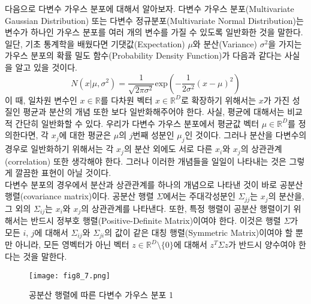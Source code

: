 \documentclass[a4paper]{oblivoir}
\begin{document}
다음으로 다변수 가우스 분포에 대해서 알아보자. 다변수 가우스 분포(Multivariate Gaussian Distribution) 또는 다변수 정규분포(Multivariate Normal Distribution)는 변수가 하나인 가우스 분포를 여러 개의 변수를 가질 수 있도록 일반화한 것을 말한다. 일단, 기초 통계학을 배웠다면 기댓값(Expectation) $\mu$와 분산(Variance) $\sigma^2$을 가지는 가우스 분포의 확률 밀도 함수(Probability Density Function)가 다음과 같다는 사실을 알고 있을 것이다. 
\begin{equation}
N(x|\mu, \sigma^2) = \frac{1}{\sqrt{2 \pi \sigma^2}} \textrm{exp}(-\frac{1}{2 \sigma^2} (x-\mu)^2) \label{eq:8-13} 
\end{equation}
이 때, 일차원 변수인 $x \in \mathbb{R}$를 다차원 벡터 $ {x} \in {\mathbb{R}}^{D}$로 확장하기 위해서는 $x$가 가진 성질인 평균과 분산의 개념 또한 보다 일반화해주어야 한다. 사실, 평균에 대해서는 비교적 간단히 일반화할 수 있다. 우리가 다변수 가우스 분포에서 평균값 벡터 $ {\mu} \in {\mathbb{R}}^{D}$를 정의한다면, 각 $x_j$에 대한 평균은 $ {\mu}$의 $j$번째 성분인 $\mu_j$인 것이다. 그러나 분산을 다변수의 경우로 일반화하기 위해서는 각 $x_j$의 분산 외에도 서로 다른 $x_i$와 $x_j$의 상관관계(correlation) 또한 생각해야 한다. 그러나 이러한 개념들을 일일이 나타내는 것은 그렇게 깔끔한 표현이 아닐 것이다. \\

다변수 분포의 경우에서 분산과 상관관계를 하나의 개념으로 나타낸 것이 바로 공분산 행렬(covariance matrix)이다. 공분산 행렬 $ {\Sigma}$에서는 주대각성분인 $ {\Sigma}_{jj}$는 $x_j$의 분산을, 그 외의 $ {\Sigma}_{ij}$는 $x_i$와 $x_j$의 상관관계를 나타낸다. 또한, 특정 행렬이 공분산 행렬이기 위해서는 반드시 정부호 행렬(Positive-Definite Matrix)이여야 한다. 이것은 행렬 $ {\Sigma}$가 모든 $i$, $j$에 대해서 $ {\Sigma}_{ij}$와 $ {\Sigma}_{ji}$의 값이 같은 대칭 행렬(Symmetric Matrix)이여야 할 뿐만 아니라, 모든 영벡터가 아닌 벡터 $ {z} \in {\mathbb{R}}^{D} \setminus \{  {0} \}$에 대해서 $ {z}^{T}  {\Sigma}  {z}$가 반드시 양수여야 한다는 것을 말한다. \\

\begin{figure}[ht] \centering 
\texttt{[image: fig8\_7.png]} 
\caption{공분산 행렬에 따른 다변수 가우스 분포 1}
\label{fig:8-7}
\end{figure} 
\end{document}
